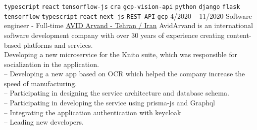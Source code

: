 \begin{entrylist}
{        \texttt{typescript}\slashsep
        \texttt{react}\slashsep
        \texttt{tensorflow-js}\slashsep
        \texttt{cra}\slashsep
        \texttt{gcp-vision-api}\slashsep
        \texttt{python}\slashsep
        \texttt{django}\slashsep
        \texttt{flask}\slashsep
        \texttt{tensorflow}\slashsep
        \texttt{typescript}\slashsep
        \texttt{react}\slashsep
        \texttt{next-js}\slashsep
        \texttt{REST-API}\slashsep
        \texttt{gcp}\slashsep
    }
    \entry
    {4/2020 -- 11/2020}
    {Software engineer - Full-time}
    {
        \href{https://www.linkedin.com/company/avid-technology-development/}{AVID Arvand - Tehran / Iran}}
    {
        AvidArvand is an international software development company with over 30 years of experience creating content-based platforms and services. \\
        Developing a new microservice for the Knito suite, which was responsible for socialization in the application.\\
        -- Developing a new app based on OCR which helped
        the company increase the speed of manufacturing. \\
        -- Participating in designing the service architecture and database schema. \\
        -- Participating in developing the service using prisma-js and Graphql \\
        -- Integrating the application authentication with keycloak \\
        -- Leading new developers. \\

}
\end{entrylist}
